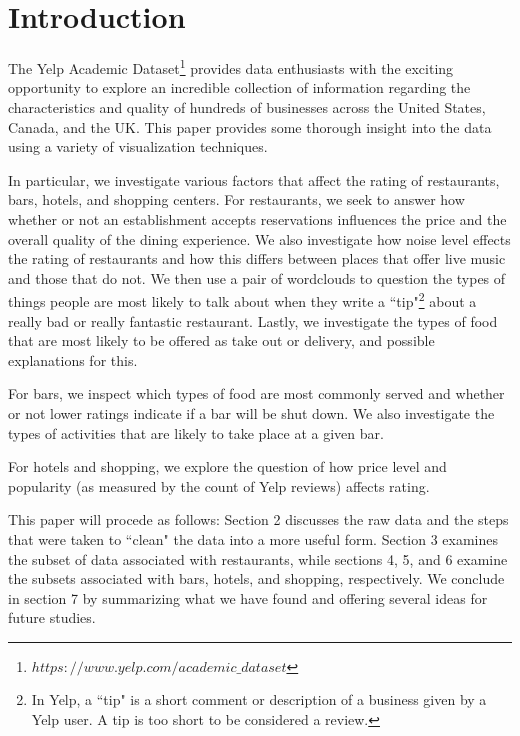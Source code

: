 \documentclass[11pt]{article}
\begin{document}
\newpage

\tableofcontents

\newpage

\pagestyle{fancy}
\rhead{\thepage}
\rfoot{\today}
\cfoot{}%


\section{Introduction}

The Yelp Academic Dataset\footnote{$https://www.yelp.com/academic\_dataset$} provides data enthusiasts with the exciting opportunity to explore an incredible collection of information regarding the characteristics and quality of hundreds of businesses across the United States, Canada, and the UK. This paper provides some thorough insight into the data using a variety of visualization techniques. 

In particular, we investigate various factors that affect the rating of restaurants, bars, hotels, and shopping centers. For restaurants, we seek to answer how whether or not an establishment accepts reservations influences the price and the overall quality of the dining experience. We also investigate how noise level effects the rating of restaurants and how this differs between places that offer live music and those that do not. We then use a pair of wordclouds to question the types of things people are most likely to talk about when they write a ``tip"\footnote{In Yelp, a ``tip" is a short comment or description of a business given by a Yelp user. A tip is too short to be considered a review.} about a really bad or really fantastic restaurant. Lastly, we investigate the types of food that are most likely to be offered as take out or delivery, and possible explanations for this.

For bars, we inspect which types of food are most commonly served and whether or not lower ratings indicate if a bar will be shut down. We also investigate the types of activities that are likely to take place at a given bar.

For hotels and shopping, we explore the question of how price level and popularity (as measured by the count of Yelp reviews) affects rating.

This paper will procede as follows: Section 2 discusses the raw data and the steps that were taken to ``clean" the data into a more useful form. Section 3 examines the subset of data associated with restaurants, while sections 4, 5, and 6 examine the subsets associated with bars, hotels, and shopping, respectively. We conclude in section 7 by summarizing what we have found and offering several ideas for future studies.
\end{document}
